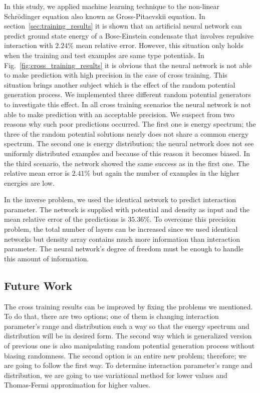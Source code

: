 \documentclass[a4paper,times,hidelinks,12pt]{article}
\begin{document}
In this study, we applied machine learning technique to the non-linear Schr\"{o}dinger equation also known as Gross-Pitaevskii equation. In section~\ref{sec:training_results} it is shown that an artificial neural network can predict ground state energy of a Bose-Einstein condensate that involves repulsive interaction with $2.24\%$ mean relative error. However, this situation only holds when the training and test examples are same type potentials. In Fig.~\ref{fig:cross_training_results} it is obvious that the neural network is not able to make prediction with high precision in the case of cross training. This situation brings another subject which is the effect of the random potential generation process. We implemented three different random potential generators to investigate this effect. In all cross training scenarios the neural network is not able to make prediction with an acceptable precision. We suspect from two reasons why such poor predictions occurred. The first one is energy spectrum; the three of the random potential solutions nearly does not share a common energy spectrum. The second one is energy distribution; the neural network does not see uniformly distributed examples and because of this reason it becomes biased. In the third scenario, the network showed the same success as in the first one. The relative mean error is $2.41\%$ but again the number of examples in the higher energies are low.  

In the inverse problem, we used the identical network to predict interaction parameter. The network is supplied with potential and density as input and the mean relative error of the predictions is $35.36\%$. To overcome this precision problem, the total number of layers can be increased since we used identical networks but density array contains much more information than interaction parameter. The neural network's degree of freedom must be enough to handle this amount of information. 

\subsection{Future Work}

The cross training results can be improved by fixing the problems we mentioned. To do that, there are two options; one of them is changing interaction parameter's range and distribution such a way so that the energy spectrum and distribution will be in desired form. The second way which is generalized version of previous one is also manipulating random potential generation process without biasing randomness. The second option is an entire new problem; therefore; we are going to follow the first way. To determine interaction parameter's range and distribution, we are going to use variational method for lower values and Thomas-Fermi approximation for higher values.


\clearpage

\clearpage


\end{document}
